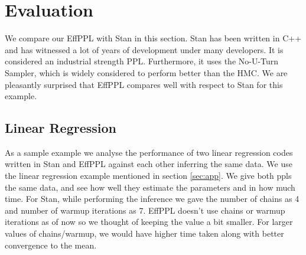 \documentclass[a4paper,11pt]{article}
\theoremstyle{mytheor}
\begin{document}
    \newpage
\section{Evaluation}
\label{sec:eval}
    We compare our EffPPL with Stan in this section. Stan has been written in C++ and has witnessed a lot of years of development under many developers. It is considered an industrial strength PPL. Furthermore, it uses the No-U-Turn Sampler, which is widely considered to perform better than the HMC. We are pleasantly surprised that EffPPL compares well with respect to Stan for this example. 
    
    \subsection{Linear Regression}
        
         As a sample example we analyse the performance of two linear regression codes written in Stan and EffPPL against each other inferring the same data. We use the linear regression example mentioned in section \ref{sec:app}. We give both ppls the same data, and see how well they estimate the parameters and in how much time. For Stan, while performing the inference we gave the number of chains as 4 and number of warmup iterations as 7. EffPPL doesn't use chains or warmup iterations as of now so we thought of keeping the value a bit smaller. For larger values of chains/warmup, we would have higher time taken along with better convergence to the mean.
        
\end{document}
